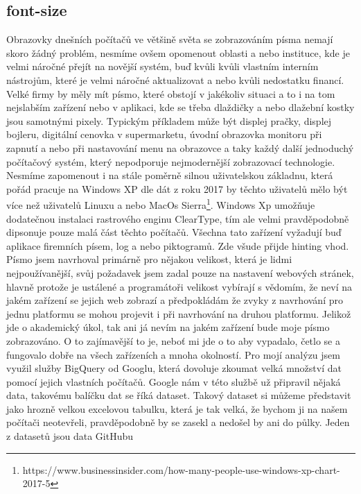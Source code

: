 \documentclass[a4paper]{article}
\begin{document}
\begin{enumerate}
\subsection{font-size}
Obrazovky dnešních počítačů ve většině světa se zobrazováním písma nemají skoro žádný problém, nesmíme ovšem opomenout oblasti a nebo instituce, kde je velmi náročné přejít na novější systém, buď kvůli kvůli vlastním interním nástrojům, které je velmi náročné aktualizovat a nebo kvůli nedostatku financí. Velké firmy by měly mít písmo, které obstojí v jakékoliv situaci a to i na tom nejslabším zařízení nebo v aplikaci, kde se třeba dlaždičky a nebo dlažební kostky jsou samotnými pixely. Typickým příkladem může být displej pračky, displej bojleru, digitální cenovka v supermarketu, úvodní obrazovka monitoru při zapnutí a nebo při nastavování menu na obrazovce a taky každý další jednoduchý počítačový systém, který nepodporuje nejmodernější zobrazovací technologie. Nesmíme zapomenout i na stále poměrně silnou uživatelskou základnu, která pořád pracuje na Windows XP dle dát z roku 2017 by těchto uživatelů mělo být více než uživatelů Linuxu a nebo MacOs Sierra\footnote{https://www.businessinsider.com/how-many-people-use-windows-xp-chart-2017-5}. Windows Xp umožňuje dodatečnou instalaci rastrového enginu ClearType, tím ale velmi pravděpodobně dipsonuje pouze malá část těchto počítačů. Všechna tato zařízení vyžadují buď aplikace firemních písem, log a nebo piktogramů. Zde všude přijde hinting vhod. Písmo jsem navrhoval primárně pro nějakou velikost, která je lidmi nejpoužívanější, svůj požadavek jsem zadal pouze na nastavení webových stránek, hlavně protože je ustálené a programátoři velikost vybírají s vědomím, že neví na jakém zařízení se jejich web zobrazí a předpokládám že zvyky z navrhování pro jednu platformu se mohou projevit i při navrhování na druhou platformu. Jelikož jde o akademický úkol, tak ani já nevím na jakém zařízení bude moje písmo zobrazováno. O to zajímavější to je, neboť mi jde o to aby vypadalo, četlo se a fungovalo dobře na všech zařízeních a mnoha okolností. Pro mojí analýzu jsem využil služby BigQuery od Googlu, která dovoluje zkoumat velká množství dat pomocí jejich vlastních počítačů. Google nám v této službě už připravil nějaká data, takovému balíčku dat se říká dataset. Takový dataset si můžeme představit jako hrozně velkou excelovou tabulku, která je tak velká, že bychom ji na našem počítači neotevřeli, pravděpodobně by se zasekl a nedošel by ani do půlky. Jeden z datasetů jsou data GitHubu
\end{enumerate}
\end{document}
